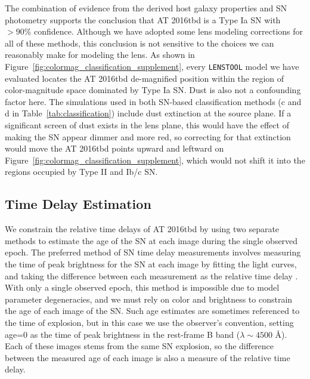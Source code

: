\documentclass[12pt]{article}
\def\SNABC{AT 2016tbd\xspace}
\def\lenstool{{\tt LENSTOOL}\xspace}
\begin{document}
The combination of evidence from the derived host galaxy properties  and SN photometry supports the conclusion that \SNABC  is  a Type Ia SN with $>90\%$ confidence.  Although we have adopted some lens modeling corrections for all of these methods, this conclusion is not sensitive to the choices we can reasonably make for modeling the lens.  As shown in Figure~\ref{fig:colormag_classification_supplement}, every  \lenstool model we have evaluated locates the \SNABC  de-magnified position within the region of color-magnitude space dominated by Type Ia SN. Dust is also not a confounding factor here. 
The simulations used in both SN-based classification methods (c and d in Table~\ref{tab:classification}) include dust extinction at the source plane.  If a significant screen of dust exists in the lens plane, this would have the effect of making the SN appear dimmer and more red, so correcting for that extinction would move the \SNABC points upward and leftward on Figure~\ref{fig:colormag_classification_supplement}, which would not shift it into the regions occupied by Type II and Ib/c SN. 


\subsection*{Time Delay Estimation}

We constrain the relative time delays of \SNABC by using two separate methods to estimate the age of the SN at each image during the single observed epoch. The preferred method of SN time delay measurements involves measuring the time of peak brightness for the SN at each image by fitting the light curves, and taking the difference between each measurement as the relative time delay \cite{pierel_turning_2019,dhawan_magnification_2019,huber_strongly_2019}. With only a single observed epoch, this method is impossible due to model parameter degeneracies, and we must rely on color and brightness to constrain the age of each image of the SN. Such age estimates are sometimes referenced to the time of explosion, but in this case we use the observer's convention, setting age=0 as the time of peak brightness in the rest-frame B band ($\lambda\sim4500$ \AA).  Each of these images stems from the same SN explosion, so the difference between the measured age of each image is also a measure of the relative time delay. 
\end{document}
